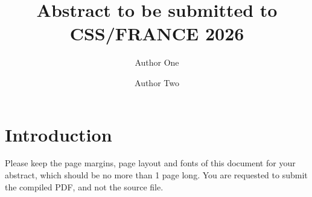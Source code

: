 \documentclass[11pt,longbibliography]{article}
\title{Abstract to be submitted to CSS/FRANCE 2026}
\author[1]{Author One}
\author[2]{Author Two}
\affil[1]{CSS/FRANCE}
\affil[2]{Mars}
\begin{document}
\date{}
\maketitle


\section{Introduction}
\label{sec:intro}
 Please keep the page margins, page layout and fonts of this document for your abstract, which should be no more than 1 page long. You are requested to submit the compiled PDF, and not the source file.



\end{document}
